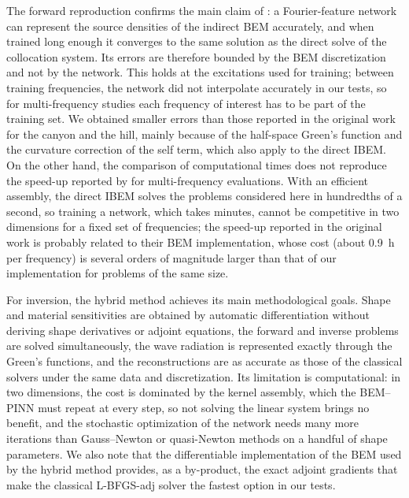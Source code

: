 \documentclass[11pt,twoside]{article}
\begin{document}
The forward reproduction confirms the main claim of \citet{wu_novel_2026}: a Fourier-feature network can represent the source densities of the indirect BEM accurately, and when trained long enough it converges to the same solution as the direct solve of the collocation system. Its errors are therefore bounded by the BEM discretization and not by the network. This holds at the excitations used for training; between training frequencies, the network did not interpolate accurately in our tests, so for multi-frequency studies each frequency of interest has to be part of the training set. We obtained smaller errors than those reported in the original work for the canyon and the hill, mainly because of the half-space Green's function and the curvature correction of the self term, which also apply to the direct IBEM. On the other hand, the comparison of computational times does not reproduce the speed-up reported by \citet{wu_novel_2026} for multi-frequency evaluations. With an efficient assembly, the direct IBEM solves the problems considered here in hundredths of a second, so training a network, which takes minutes, cannot be competitive in two dimensions for a fixed set of frequencies; the speed-up reported in the original work is probably related to their BEM implementation, whose cost (about 0.9~h per frequency) is several orders of magnitude larger than that of our implementation for problems of the same size.

For inversion, the hybrid method achieves its main methodological goals. Shape and material sensitivities are obtained by automatic differentiation without deriving shape derivatives or adjoint equations, the forward and inverse problems are solved simultaneously, the wave radiation is represented exactly through the Green's functions, and the reconstructions are as accurate as those of the classical solvers under the same data and discretization. Its limitation is computational: in two dimensions, the cost is dominated by the kernel assembly, which the BEM--PINN must repeat at every step, so not solving the linear system brings no benefit, and the stochastic optimization of the network needs many more iterations than Gauss--Newton or quasi-Newton methods on a handful of shape parameters. We also note that the differentiable implementation of the BEM used by the hybrid method provides, as a by-product, the exact adjoint gradients that make the classical L-BFGS-adj solver the fastest option in our tests.
\end{document}
